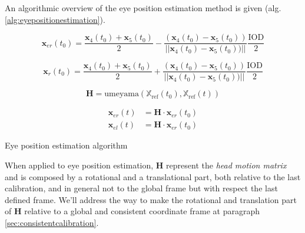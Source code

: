 \documentclass[acmtocl,acmnow]{acmtrans2m}
\begin{document}
An algorithmic overview of the eye position estimation method is given (alg. \ref{alg:eyepositionestimation}).
\begin{algorithm}[htb]\label{alg:eyepositionestimation}


{
\begin{equation*}
\mathbf{x}_{er}(t_0) =  \frac{\mathbf{x}_4(t_0) + \mathbf{x}_5(t_0)}{2} - 
\frac{ (\mathbf{x}_4(t_0) - \mathbf{x}_5(t_0)) }{||\mathbf{x}_4(t_0) -
\mathbf{x}_5(t_0))||}\frac{\textrm{IOD}}{2}
\end{equation*}

\begin{equation*}
\mathbf{x}_{r}(t_0) =  \frac{\mathbf{x}_4(t_0) + \mathbf{x}_5(t_0)}{2} +  \frac{
(\mathbf{x}_4(t_0) - \mathbf{x}_5(t_0)) }{||\mathbf{x}_4(t_0) -
\mathbf{x}_5(t_0))||}\frac{\textrm{IOD}}{2}
\end{equation*}
}
{
\begin{equation*}
\mathbf{H} = \textrm{umeyama}\left( \mathbb{X}_{\textrm{ref}}(t_0),
\mathbb{X}_{\textrm{ref}}(t) \right) 
\end{equation*}

\begin{eqnarray*}
\mathbf{x}_{er}(t) & = \mathbf{H} \cdot \mathbf{x}_{er}(t_0) \\
\mathbf{x}_{el}(t) &= \mathbf{H}  \cdot \mathbf{x}_{er}(t_0)
\end{eqnarray*}

}
\caption{Eye position estimation algorithm}
\end{algorithm}

When applied to eye position estimation, $\mathbf{H}$ represent the \emph{head motion
matrix} and is composed by a rotational and a translational part, both relative to the last calibration, and in general not to the global frame but with respect the last defined frame.
We'll address the way to make the rotational and translation part of $\mathbf{H}$ relative to a global and consistent coordinate frame at paragraph \ref{sec:consistentcalibration}.
\end{document}
